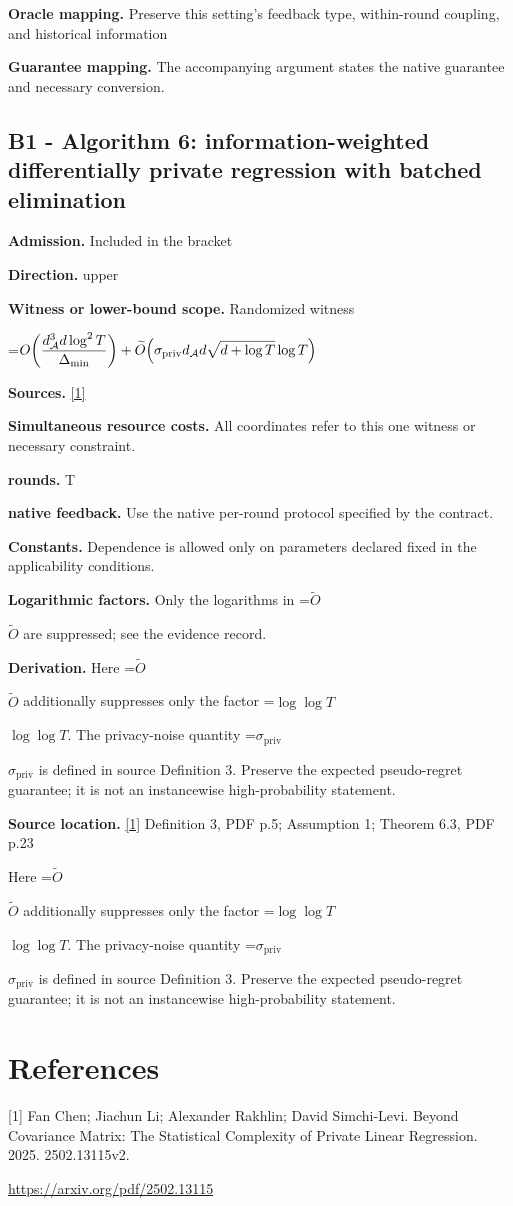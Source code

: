 \documentclass[10pt,a4paper]{article}
\newcommand{\AtlasMath}[1]{\par\begingroup\centering\setbox0=\hbox{$\displaystyle #1$}\ifdim\wd0>1.4\linewidth\typeout{ATLAS WIDE FORMULA: \the\wd0}\fi\ifdim\wd0>\linewidth\resizebox{\linewidth}{!}{\box0}\else\box0\fi\par\endgroup}
\newcommand{\AtlasInlineMath}[1]{\begingroup\setbox0=\hbox{$#1$}\ifdim\wd0>.4\linewidth\endgroup\AtlasMath{#1}\else\endgroup$#1$\fi}
\begin{document}
\textbf{Oracle mapping.} Preserve this setting's feedback type, within-round coupling, and historical information

\textbf{Guarantee mapping.} The accompanying argument states the native guarantee and necessary conversion.

\subsection{B1 - Algorithm 6: information-weighted differentially private regression with batched elimination}
\textbf{Admission.} Included in the bracket

\textbf{Direction.} upper

\textbf{Witness or lower-bound scope.} Randomized witness

\AtlasMath{O\!\left(\frac{d_{\mathcal{A}}^{3}d\log^2T}{\Delta_{\min}}\right)+\widetilde{O}\!\left(\sigma_{\rm priv}d_{\mathcal{A}}d\sqrt{d+\log T}\log T\right)}
\textbf{Sources.} \href{https://arxiv.org/pdf/2502.13115}{[1]}

\textbf{Simultaneous resource costs.} All coordinates refer to this one witness or necessary constraint.

\textbf{rounds.} T

\textbf{native feedback.} Use the native per-round protocol specified by the contract.

\textbf{Constants.} Dependence is allowed only on parameters declared fixed in the applicability conditions.

\textbf{Logarithmic factors.} Only the logarithms in \AtlasInlineMath{\widetilde O} are suppressed; see the evidence record.

\textbf{Derivation.} Here \AtlasInlineMath{\widetilde O} additionally suppresses only the factor \AtlasInlineMath{\log\log T}. The privacy-noise quantity \AtlasInlineMath{\sigma_{\mathrm{priv}}} is defined in source Definition 3. Preserve the expected pseudo-regret guarantee; it is not an instancewise high-probability statement.

\textbf{Source location.} \href{https://arxiv.org/pdf/2502.13115}{[1]} Definition 3, PDF p.5; Assumption 1; Theorem 6.3, PDF p.23

Here \AtlasInlineMath{\widetilde O} additionally suppresses only the factor \AtlasInlineMath{\log\log T}. The privacy-noise quantity \AtlasInlineMath{\sigma_{\mathrm{priv}}} is defined in source Definition 3. Preserve the expected pseudo-regret guarantee; it is not an instancewise high-probability statement.

\section{References}
[1] Fan Chen; Jiachun Li; Alexander Rakhlin; David Simchi-Levi. Beyond Covariance Matrix: The Statistical Complexity of Private Linear Regression. 2025. 2502.13115v2.

\url{https://arxiv.org/pdf/2502.13115}
\end{document}
